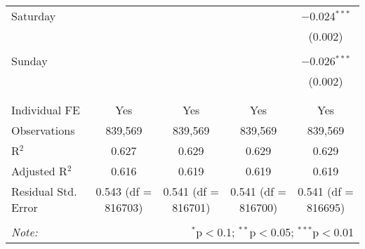 \documentclass[
]{article}
\begin{document}
\begin{table}[!htbp]
{\begin{tabular}{@{\extracolsep{5pt}}lcccc}
 Saturday &  &  &  & $-$0.024$^{***}$ \\ 
  &  &  &  & (0.002) \\ 
  & & & & \\ 
 Sunday &  &  &  & $-$0.026$^{***}$ \\ 
  &  &  &  & (0.002) \\ 
  & & & & \\ 
\hline \\[-1.8ex] 
Individual FE & Yes & Yes & Yes & Yes \\ 
Observations & 839,569 & 839,569 & 839,569 & 839,569 \\ 
R$^{2}$ & 0.627 & 0.629 & 0.629 & 0.629 \\ 
Adjusted R$^{2}$ & 0.616 & 0.619 & 0.619 & 0.619 \\ 
Residual Std. Error & 0.543 (df = 816703) & 0.541 (df = 816701) & 0.541 (df = 816700) & 0.541 (df = 816695) \\ 
\hline 
\hline \\[-1.8ex] 
\textit{Note:}  & \multicolumn{4}{r}{$^{*}$p$<$0.1; $^{**}$p$<$0.05; $^{***}$p$<$0.01} \\ 
\end{tabular}
} 
\end{table} 
\newpage
\end{document}
